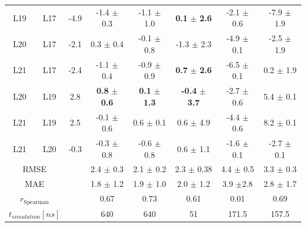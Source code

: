 \begin{table}[h]
\begin{center}
{\begin{tabular}{ c c |c |c|c|c|c|c}
        L19 &  L17 & -4.9 & -1.4 $\pm$ 0.3          & -1.1 $\pm$ 1.0         & \textbf{0.1} $\pm$ \textbf{2.6}                    &   -2.1 $\pm$ 0.6 & -7.9 $\pm$ 1.9\\
        L20 &  L17 & -2.1 &  0.3 $\pm$ 0.4          & -0.1 $\pm$ 0.8         & -1.3 $\pm$ 2.3                                     &   -4.9 $\pm$ 0.1 & -2.5 $\pm$ 1.9\\
        L21 &  L17 & -2.4 & -1.1 $\pm$ 0.4          & -0.9 $\pm$ 0.9         &\textbf{0.7} $\pm$ \textbf{2.6}                     &  -6.5 $\pm$ 0.1 &  0.2 $\pm$ 1.9\\
        L20 &  L19 & 2.8  &\textbf{0.8} $\pm$ \textbf{0.6}   & \textbf{0.1} $\pm$ \textbf{1.3} & \textbf{-0.4} $\pm$ \textbf{3.7} &  -2.7 $\pm$ 0.6 &  5.4 $\pm$ 0.1\\
        L21 &  L19 & 2.5  & -0.1 $\pm$ 0.6         &  0.6 $\pm$ 0.1         &  0.6 $\pm$ 4.9                                      &  -4.4 $\pm$ 0.6 &  8.2 $\pm$ 0.1\\
        L21 &  L20 & -0.3 & -0.3 $\pm$ 0.8         & -0.6 $\pm$ 0.8         &  0.6 $\pm$ 1.1                                    &    -1.6 $\pm$ 0.1 &   -2.7 $\pm$ 0.1\\ 
    \hline
        \multicolumn{2}{c|}{RMSE} &                    & 2.4  $\pm$ 0.3           & 2.1  $\pm$ 0.2          &  2.3  $\pm$ 0.38      & 4.4 $\pm$ 0.5         & 3.3  $\pm$ 0.3 \\
        \multicolumn{2}{c|}{MAE} &                     & 1.8 $\pm$ 1.2 & 1.9 $\pm$ 1.0 & 2.0 $\pm$ 1.2 & 3.9 $\pm$2.8 & 2.8 $\pm$ 1.7 \\
        \multicolumn{2}{c|}{$r_{\text{Spearman}}$} & & 0.67           & 0.73          & 0.61          & 0.01           & 0.69 \\
        \multicolumn{2}{c|}{$t_{simulation} [ns]$} & & 640          &  640         &  51        & 171.5         & 157.5  \\
\end{tabular}
}
\end{center}
\label{tab: RE-EDS_FE_RingCycleOpening_ddF}
\end{table}

% 
%



